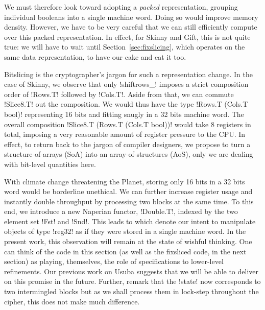 \documentclass[draft,english]{jflart}
\begin{document}
We must therefore look toward adopting a \emph{packed} representation,
grouping individual booleans into a single machine word. Doing so
would improve memory density. However, we have to be very careful that
we can still efficiently compute over this packed representation. In
effect, for Skinny and Gift, this is not quite true: we will have to
wait until Section~\ref{sec:fixslicing}, which operates on the same
data representation, to have our cake and eat it too.


Bitslicing is the cryptographer's jargon for such a representation
change. In the case of Skinny, we observe that only \coqe!shiftrows_!
imposes a strict composition order of \coqe!Rows.T! followed by
\coqe!Cols.T!. Aside from that, we can commute \coqe!Slice8.T! out the
composition. We would thus have the type \coqe!Rows.T (Cols.T bool)!
representing 16 bits and fitting snugly in a 32 bits machine word. The
overall composition \coqe!Slice8.T (Rows.T (Cols.T bool))! would take
8 registers in total, imposing a very reasonable amount of register
pressure to the CPU.
%
In effect, to return back to the jargon of compiler designers, we
propose to turn a structure-of-arrays (SoA) into an
array-of-structures (AoS), only we are dealing with bit-level
quantities here.


With climate change threatening the Planet, storing only 16 bits in a
32 bits word would be borderline unethical. We can further increase
register usage and instantly double throughput by processing two
blocks at the same time. To this end, we introduce a new Naperian
functor, \coqe!Double.T!, indexed by the two element set \coqe!Fst!
and \coqe!Snd!. This leads to
%
%
which denote our intent to manipulate objects of type \coqe!reg32! as
if they were stored in a single machine word. In the present work,
this observation will remain at the state of wishful thinking. One can
think of the code in this section (as well as the fixsliced code, in
the next section) as playing, themselves, the role of specifications
to lower-level refinements. Our previous work on Usuba suggests that
we will be able to deliver on this promise in the future. Further,
remark that the \coqe!state! now corresponds to two intermingled
blocks but as we shall process them in lock-step throughout the
cipher, this does not make much difference.
\end{document}
